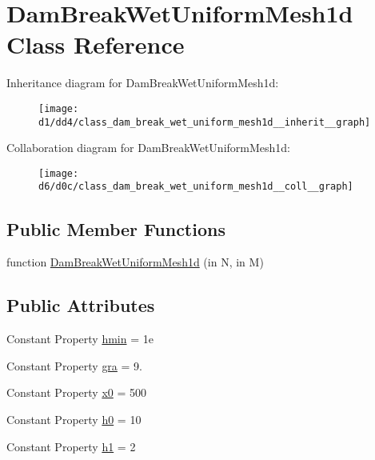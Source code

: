 \hypertarget{class_dam_break_wet_uniform_mesh1d}{}\section{Dam\+Break\+Wet\+Uniform\+Mesh1d Class Reference}
\label{class_dam_break_wet_uniform_mesh1d}


Inheritance diagram for Dam\+Break\+Wet\+Uniform\+Mesh1d\+:
\nopagebreak
\begin{figure}[H]
\begin{center}
\leavevmode
\texttt{[image: d1/dd4/class\_dam\_break\_wet\_uniform\_mesh1d\_\_inherit\_\_graph]}
\end{center}
\end{figure}


Collaboration diagram for Dam\+Break\+Wet\+Uniform\+Mesh1d\+:
\nopagebreak
\begin{figure}[H]
\begin{center}
\leavevmode
\texttt{[image: d6/d0c/class\_dam\_break\_wet\_uniform\_mesh1d\_\_coll\_\_graph]}
\end{center}
\end{figure}
\subsection*{Public Member Functions}
\begin{DoxyCompactItemize}
\item 
function \hyperlink{class_dam_break_wet_uniform_mesh1d_ac5e45fa1266cd1aa8e4775115c3fad12}{Dam\+Break\+Wet\+Uniform\+Mesh1d} (in N, in M)
\end{DoxyCompactItemize}
\subsection*{Public Attributes}
\begin{DoxyCompactItemize}
\item 
Constant Property \hyperlink{class_dam_break_wet_uniform_mesh1d_aa2aef07cbc63f84a5f5627c5c3506b22}{hmin} = 1e
\item 
Constant Property \hyperlink{class_dam_break_wet_uniform_mesh1d_a2bdd2015abb86266c86a08641823034a}{gra} = 9.
\item 
Constant Property \hyperlink{class_dam_break_wet_uniform_mesh1d_ad57790279741884fb135ae398ee53809}{x0} = 500
\item 
Constant Property \hyperlink{class_dam_break_wet_uniform_mesh1d_a3d68dd84f8fb1fc72ee4a8a9aee83338}{h0} = 10
\item 
Constant Property \hyperlink{class_dam_break_wet_uniform_mesh1d_ab73cb30ea4bc5d761a14482db4e7f0c6}{h1} = 2
\end{DoxyCompactItemize}
